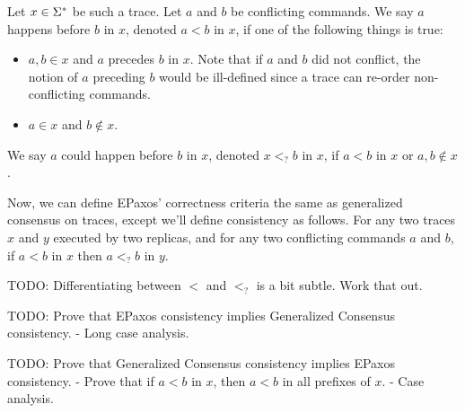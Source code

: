 Let $x \in \Sigma^*$ be such a trace. Let $a$ and $b$ be conflicting commands. We
say $a$ happens before $b$ in $x$, denoted $a < b$ in $x$, if one of the
following things is true:
\begin{itemize}
  \item
    $a, b \in x$ and $a$ precedes $b$ in $x$. Note that if $a$ and $b$ did not
    conflict, the notion of $a$ preceding $b$ would be ill-defined since a
    trace can re-order non-conflicting commands.

  \item
    $a \in x$ and $b \notin x$.
\end{itemize}
We say $a$ could happen before $b$ in $x$, denoted $x <_? b$ in $x$, if $a < b$
in $x$ or $a, b \notin x$.

Now, we can define EPaxos' correctness criteria the same as generalized
consensus on traces, except we'll define consistency as follows. For any two
traces $x$ and $y$ executed by two replicas, and for any two conflicting
commands $a$ and $b$, if $a < b$ in $x$ then $a <_? b$ in $y$.

TODO: Differentiating between $<$ and $<_?$ is a bit subtle. Work that out.

TODO: Prove that EPaxos consistency implies Generalized Consensus consistency.
- Long case analysis.

TODO: Prove that Generalized Consensus consistency implies EPaxos consistency.
- Prove that if $a < b$ in $x$, then $a < b$ in all prefixes of $x$.
- Case analysis.

